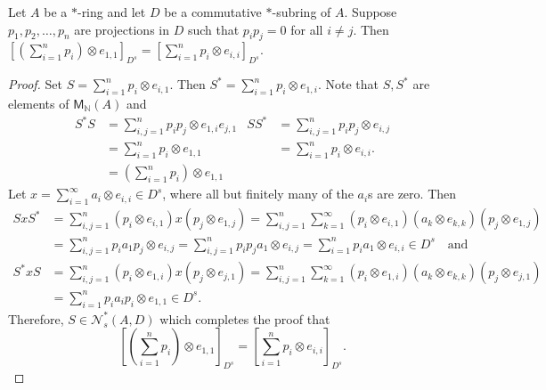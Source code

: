 \documentclass[10pt,a4paper]{amsart}
\newcommand{\NN}{\mathbb{N}}
\begin{document}
\begin{lem}\label{lem:11todiag}
Let $A$ be a $*$-ring and let $D$ be a commutative $*$-subring of $A$.  Suppose $p_1, p_2, \ldots, p_n$ are projections in $D$ such that $p_i p_j = 0$ for all $i \neq j$.  Then $\left[ \left( \sum_{i=1}^n p_i \right) \otimes e_{1,1}\right]_{D^s}= \left[ \sum_{ i = 1}^n p_i \otimes e_{i, i}\right]_{D^s}$.   
\end{lem}

\begin{proof}
Set $S = \sum_{ i = 1}^n  p_i \otimes e_{i, 1}$.  Then $S^* =  \sum_{ i = 1}^n  p_i \otimes e_{1, i}$.  Note that $S, S^*$ are elements of $\mathsf{M}_{\NN}(A)$ and 
\begin{align*}
S^*S &= \sum_{ i, j = 1}^n p_i p_j \otimes e_{1,i} e_{j,1} & SS^* &= \sum_{ i, j = 1 }^n p_ip_j \otimes e_{i,j} \\
    &= \sum_{ i = 1}^n p_i \otimes e_{1,1}  & &= \sum_{ i = 1}^n p_i \otimes e_{i,i}. \\
    &= \left( \sum_{i=1}^n p_i \right) \otimes e_{1,1}
\end{align*}
Let $x = \sum_{ i = 1}^\infty a_i \otimes e_{i,i} \in D^s$, where all but finitely many of the $a_i$s are zero.  Then
\begin{align*}
S x S^* &= \sum_{i, j = 1}^n (p_i \otimes e_{i,1} ) x ( p_j \otimes e_{1,j} ) =  \sum_{ i , j = 1}^n \sum_{ k = 1}^\infty (p_i \otimes e_{i,1 } )(a_k \otimes e_{k,k}) (p_j \otimes e_{1,j})\\
        &= \sum_{i, j = 1}^n p_i a_1 p_j \otimes e_{i,j} = \sum_{ i, j=1}^n p_i p_j a_1 \otimes e_{i,j} = \sum_{ i =1}^n p_i a_1 \otimes e_{i, i} \in D^s \quad \text{and} \\
S^* x S &= \sum_{ i , j = 1}^n (p_i \otimes e_{1,i } )x(p_j \otimes e_{j,1}) = \sum_{ i , j = 1}^n \sum_{ k = 1}^\infty (p_i \otimes e_{1,i } )(a_k \otimes e_{k,k}) (p_j \otimes e_{j,1}) \\
        &= \sum_{ i = 1}^n p_i a_i p_i \otimes e_{1,1} \in D^s.
\end{align*}
Therefore, $S \in \mathcal{N}_s^*(A,D)$ which completes the proof that \[\left[ \left( \sum_{i=1}^n p_i \right) \otimes e_{1,1}\right]_{D^s}= \left[ \sum_{ i = 1}^n p_i \otimes e_{i, i}\right]_{D^s}.\]
\end{proof}
\end{document}
